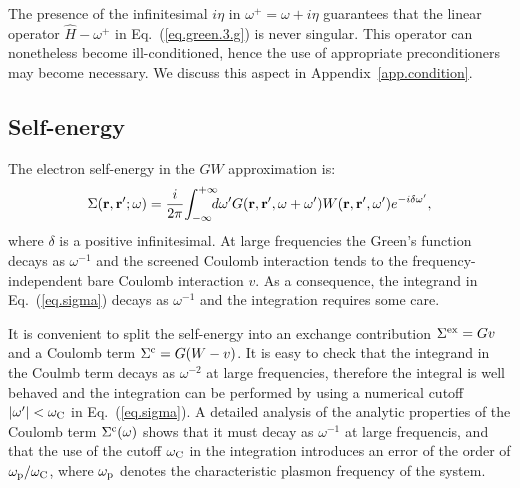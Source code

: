 \documentclass[twocolumn,prb,showpacs,superscriptaddress]{revtex4}
\def\w{\omega}
\def\wp{\omega^\prime}
\def\wc{{\omega_{\rm C}}}
\def\H{\hat{H}}
\def\r{{\bf r}}
\def\rp{{\bf r^\prime}}
\begin{document}
The presence of the infinitesimal $i\eta$ in $\w^+=\w+i\eta$ 
guarantees that the linear operator $\H-\w^+$ in Eq.\ (\ref{eq.green.3.g}) is
never singular.
This operator can nonetheless become ill-conditioned, hence the use of appropriate
preconditioners may become necessary. We discuss this aspect 
in Appendix~\ref{app.condition}.

\subsection{Self-energy}\label{sec.sigma}

The electron self-energy in the $GW$ approximation is:\cite{hl86}
  \begin{equation} \label{eq.sigma}
  \Sigma(\r,\rp;\w) = \frac{i}{2\pi} \! \int_{-\infty}^{+\infty} \!\!\!\!d\wp 
    G(\r,\rp,\w+\wp) W(\r,\rp,\wp) e^{-i\delta\wp},
  \end{equation}
where $\delta$ is a positive infinitesimal. 
At large frequencies the Green's function decays as $\w^{-1}$ and 
the screened Coulomb interaction tends to the frequency-independent
bare Coulomb interaction $v$. As a consequence, the integrand in Eq.\ (\ref{eq.sigma}) 
decays as $\w^{-1}$ and the integration requires some care.

It is convenient to split the self-energy into an exchange contribution 
$\Sigma^{\rm ex}=Gv$ and a Coulomb term $\Sigma^{\rm c}=G(W-v)$.\cite{blochl}
It is easy to check that the integrand in the Coulmb term decays as 
$\w^{-2}$ at large frequencies, therefore the integral is well behaved and the 
integration can be performed by using a numerical cutoff $|\wp|< \wc$ 
in Eq.\ (\ref{eq.sigma}).
A detailed analysis of the analytic properties of the Coulomb term
$\Sigma^{\rm c}(\w)$ shows that it must decay as $\w^{-1}$ 
at large frequencis, and that the use of the cutoff $\wc$ in the integration 
introduces an error of the order of $\w_{\rm p}/\wc$, where $\w_{\rm p}$ denotes
the characteristic plasmon frequency of the system.
\end{document}
